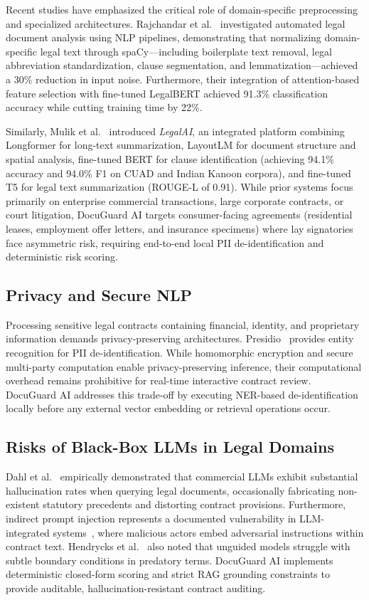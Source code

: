 \documentclass[conference]{IEEEtran}
\begin{document}
Recent studies have emphasized the critical role of domain-specific preprocessing and specialized architectures. Rajchandar et al.~\cite{rajchandar2025nlp} investigated automated legal document analysis using NLP pipelines, demonstrating that normalizing domain-specific legal text through spaCy---including boilerplate text removal, legal abbreviation standardization, clause segmentation, and lemmatization---achieved a 30\% reduction in input noise. Furthermore, their integration of attention-based feature selection with fine-tuned LegalBERT achieved 91.3\% classification accuracy while cutting training time by 22\%.

Similarly, Mulik et al.~\cite{mulik2026legalai} introduced \textit{LegalAI}, an integrated platform combining Longformer for long-text summarization, LayoutLM for document structure and spatial analysis, fine-tuned BERT for clause identification (achieving 94.1\% accuracy and 94.0\% F1 on CUAD and Indian Kanoon corpora), and fine-tuned T5 for legal text summarization (ROUGE-L of 0.91). While prior systems focus primarily on enterprise commercial transactions, large corporate contracts, or court litigation, DocuGuard AI targets consumer-facing agreements (residential leases, employment offer letters, and insurance specimens) where lay signatories face asymmetric risk, requiring end-to-end local PII de-identification and deterministic risk scoring.

\subsection{Privacy and Secure NLP}
Processing sensitive legal contracts containing financial, identity, and proprietary information demands privacy-preserving architectures. Presidio~\cite{presidio2021} provides entity recognition for PII de-identification. While homomorphic encryption and secure multi-party computation enable privacy-preserving inference, their computational overhead remains prohibitive for real-time interactive contract review. DocuGuard AI addresses this trade-off by executing NER-based de-identification locally before any external vector embedding or retrieval operations occur.

\subsection{Risks of Black-Box LLMs in Legal Domains}
Dahl et al.~\cite{dahl2024hallucination} empirically demonstrated that commercial LLMs exhibit substantial hallucination rates when querying legal documents, occasionally fabricating non-existent statutory precedents and distorting contract provisions. Furthermore, indirect prompt injection represents a documented vulnerability in LLM-integrated systems~\cite{greshake2023promptinjection}, where malicious actors embed adversarial instructions within contract text. Hendrycks et al.~\cite{hendrycks2021cuad} also noted that unguided models struggle with subtle boundary conditions in predatory terms. DocuGuard AI implements deterministic closed-form scoring and strict RAG grounding constraints to provide auditable, hallucination-resistant contract auditing.
\end{document}
